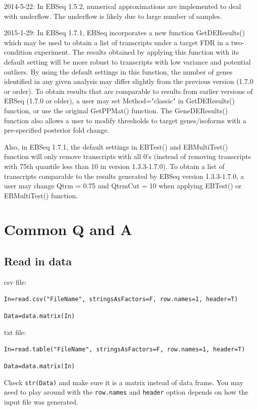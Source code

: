 \documentclass{article}
\begin{document}
2014-5-22: In EBSeq 1.5.2, numerical approximations are implemented to deal with
underflow. The underflow is likely due to large number of samples.

2015-1-29: In EBSeq 1.7.1, EBSeq incorporates a new function
GetDEResults() which may be used to obtain a list of transcripts under a target FDR in a two-condition experiment.
The results obtained by applying this function with its default setting will be
more robust to transcripts with low variance and potential outliers.
By using the default settings in this function,
the number of genes identified in any given analysis may
differ slightly from the previous version (1.7.0 or order). 
To obtain results that are comparable
to results from earlier versions of EBSeq (1.7.0 or older), a user may set
Method="classic" in GetDEResults() function, or use the original GetPPMat() function.
The GeneDEResults() function also allows a user to modify thresholds to
target genes/isoforms with a pre-specified posterior fold change.

Also, in EBSeq 1.7.1, the default settings in EBTest() and EBMultiTest() function
will only remove transcripts with all 0's (instead of removing transcripts with 
75th quantile less than 10 in version 1.3.3-1.7.0).
To obtain a list of transcripts comparable to the results generated by     EBSeq version 1.3.3-1.7.0, a user may change Qtrm = 0.75 and QtrmCut = 10
when applying EBTest() or EBMultiTest() function.

\section{Common Q and A}
\subsection{Read in data}

csv file:

\verb+In=read.csv("FileName", stringsAsFactors=F, row.names=1, header=T)+

\verb+Data=data.matrix(In)+

\noindent txt file:

\verb+In=read.table("FileName", stringsAsFactors=F, row.names=1, header=T)+

\verb+Data=data.matrix(In)+

\noindent Check \verb+str(Data)+ and make sure it is a matrix instead of data frame. You may need to play around with the \verb+row.names+ 
and \verb+header+ option depends on how the input file was generated.
\end{document}
